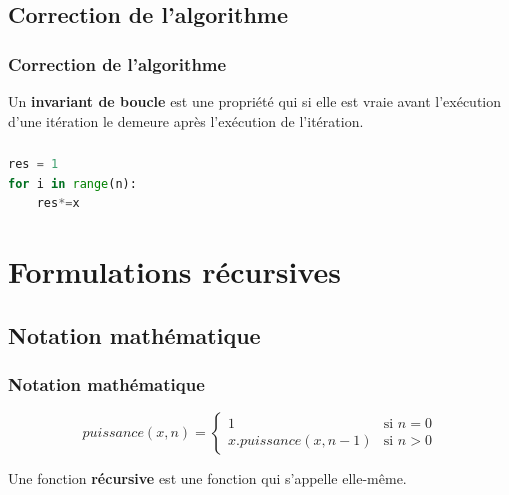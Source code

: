 \documentclass[svgnames,11pt]{beamer}
\begin{document}
\subsection{Correction de l'algorithme}
\begin{frame}
    \frametitle{Correction de l'algorithme}

    \begin{aretenir}[]
        Un \textbf{invariant de boucle} est une propriété qui si elle est vraie avant l’exécution d’une itération le demeure après l’exécution de l’itération.
    \end{aretenir}

\end{frame}
\begin{frame}[fragile]
    \frametitle{}

    \begin{center}
    \begin{lstlisting}[language=Python , basicstyle=\ttfamily\small, xleftmargin=2em, xrightmargin=2em]
res = 1
for i in range(n):
    res*=x
\end{lstlisting}
    \label{CODE}
    \end{center}
\end{frame}
\section{Formulations récursives}
\subsection{Notation mathématique}
\begin{frame}
    \frametitle{Notation mathématique}

    $$
    puissance(x,n) = \left\{
        \begin{array}{ll}
            1 & \mbox{si } n=0 \\
            x.puissance(x,n-1) & \mbox{si } n>0
        \end{array}
    \right.
    $$
\begin{aretenir}[]
Une fonction \textbf{récursive} est une fonction qui s'appelle elle-même.
\end{aretenir}   
\end{frame}
\end{document}
